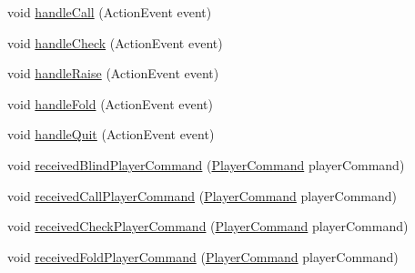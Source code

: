 \begin{DoxyCompactItemize}
\item 
void \hyperlink{classhu_1_1elte_1_1bfw1p6_1_1poker_1_1client_1_1controller_1_1game_1_1_abstract_main_game_controller_aa2ae015a5f3cb0654b1b3500e3238331}{handle\+Call} (Action\+Event event)
\item 
void \hyperlink{classhu_1_1elte_1_1bfw1p6_1_1poker_1_1client_1_1controller_1_1game_1_1_abstract_main_game_controller_a6d3692f2b6f692a1e48d2eac53df9af2}{handle\+Check} (Action\+Event event)
\item 
void \hyperlink{classhu_1_1elte_1_1bfw1p6_1_1poker_1_1client_1_1controller_1_1game_1_1_abstract_main_game_controller_ad65499a84464a6991bbd53cfbdc906d0}{handle\+Raise} (Action\+Event event)
\item 
void \hyperlink{classhu_1_1elte_1_1bfw1p6_1_1poker_1_1client_1_1controller_1_1game_1_1_abstract_main_game_controller_a46fa257a74ad13bbd4b36a86eb4a8c7c}{handle\+Fold} (Action\+Event event)
\item 
void \hyperlink{classhu_1_1elte_1_1bfw1p6_1_1poker_1_1client_1_1controller_1_1game_1_1_abstract_main_game_controller_aabf911006539e50e0aabff5966be97c6}{handle\+Quit} (Action\+Event event)
\item 
void \hyperlink{classhu_1_1elte_1_1bfw1p6_1_1poker_1_1client_1_1controller_1_1game_1_1_abstract_main_game_controller_abb791b9f9a3b5b4d959a12f3ec483099}{received\+Blind\+Player\+Command} (\hyperlink{classhu_1_1elte_1_1bfw1p6_1_1poker_1_1command_1_1_player_command}{Player\+Command} player\+Command)
\item 
void \hyperlink{classhu_1_1elte_1_1bfw1p6_1_1poker_1_1client_1_1controller_1_1game_1_1_abstract_main_game_controller_a4f54f4d378e7f857d1c51d227635292d}{received\+Call\+Player\+Command} (\hyperlink{classhu_1_1elte_1_1bfw1p6_1_1poker_1_1command_1_1_player_command}{Player\+Command} player\+Command)
\item 
void \hyperlink{classhu_1_1elte_1_1bfw1p6_1_1poker_1_1client_1_1controller_1_1game_1_1_abstract_main_game_controller_a8f8f5faeaf4c560a7d1e4e1f8f65cab1}{received\+Check\+Player\+Command} (\hyperlink{classhu_1_1elte_1_1bfw1p6_1_1poker_1_1command_1_1_player_command}{Player\+Command} player\+Command)
\item 
void \hyperlink{classhu_1_1elte_1_1bfw1p6_1_1poker_1_1client_1_1controller_1_1game_1_1_abstract_main_game_controller_a7b2a38b03dd5d1e626a58ae8c3bbc1fd}{received\+Fold\+Player\+Command} (\hyperlink{classhu_1_1elte_1_1bfw1p6_1_1poker_1_1command_1_1_player_command}{Player\+Command} player\+Command)
\item 

\end{DoxyCompactItemize}
